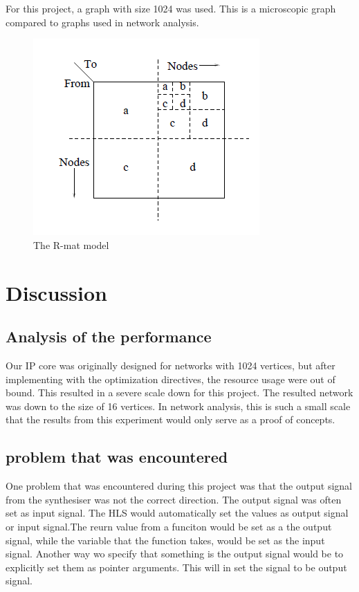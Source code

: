 For this project, a graph with size 1024 was used. This is a microscopic graph compared to graphs used in network analysis. 

\begin{figure}
\includegraphics{Figures/Rmat}
\caption{The R-mat model \cite{Rmat2004}}
\label{fig:Rmat}
\end{figure}



\section{Discussion}
\subsection*{Analysis of the performance}
Our IP core was originally designed for networks with 1024 vertices, but after implementing with the optimization directives, the resource usage were out of bound. This resulted in a severe scale down for this project. The resulted network was down to the size of 16 vertices. In network analysis, this is such a small scale that the results from this experiment would only serve as a proof of concepts. 
 
\subsection*{problem that was encountered}
One problem that was encountered during this project was that the output signal from the synthesiser was not the correct direction. The output signal was often set as input signal. The HLS would automatically set the values as output signal or input signal.The reurn value from a funciton would be set as a the output signal, while the variable that the function takes, would be set as the input signal. Another way wo specify that something is the output signal would be to explicitly set them as pointer arguments. This will in set the signal to be output signal.

